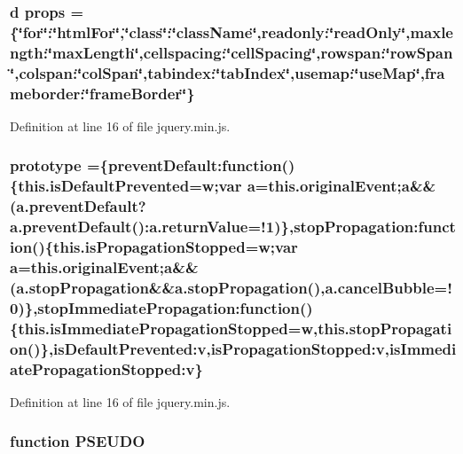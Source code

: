 \subsubsection[{props}]{\setlength{\rightskip}{0pt plus 5cm}d props =\{\char`\"{}for\char`\"{}\-:\char`\"{}html\-For\char`\"{},\char`\"{}class\char`\"{}\-:\char`\"{}class\-Name\char`\"{},readonly\-:\char`\"{}read\-Only\char`\"{},maxlength\-:\char`\"{}max\-Length\char`\"{},cellspacing\-:\char`\"{}cell\-Spacing\char`\"{},rowspan\-:\char`\"{}row\-Span\char`\"{},colspan\-:\char`\"{}col\-Span\char`\"{},tabindex\-:\char`\"{}tab\-Index\char`\"{},usemap\-:\char`\"{}use\-Map\char`\"{},frameborder\-:\char`\"{}frame\-Border\char`\"{}\}}\label{jquery_8min_8js_aa5ae403bc553f0f82a37284a8742d978}


Definition at line 16 of file jquery.\-min.\-js.

\subsubsection[{prototype}]{ prototype =\{prevent\-Default\-:function()\{this.\-is\-Default\-Prevented=w;var {\bf a}=this.\-original\-Event;{\bf a}\&\&(a.\-prevent\-Default?a.\-prevent\-Default()\-:a.\-return\-Value=!1)\},stop\-Propagation\-:function()\{this.\-is\-Propagation\-Stopped=w;var {\bf a}=this.\-original\-Event;{\bf a}\&\&(a.\-stop\-Propagation\&\&a.\-stop\-Propagation(),a.\-cancel\-Bubble=!0)\},stop\-Immediate\-Propagation\-:function()\{this.\-is\-Immediate\-Propagation\-Stopped=w,this.\-stop\-Propagation()\},is\-Default\-Prevented\-:v,is\-Propagation\-Stopped\-:v,is\-Immediate\-Propagation\-Stopped\-:v\}}\label{jquery_8min_8js_acdd925bff392dc63016a16a80bb64c1a}


Definition at line 16 of file jquery.\-min.\-js.

\subsubsection[{P\-S\-E\-U\-D\-O}]{\setlength{\rightskip}{0pt plus 5cm}function P\-S\-E\-U\-D\-O}\label{jquery_8min_8js_add2c8980616a290cab90e1257ac4440e}


